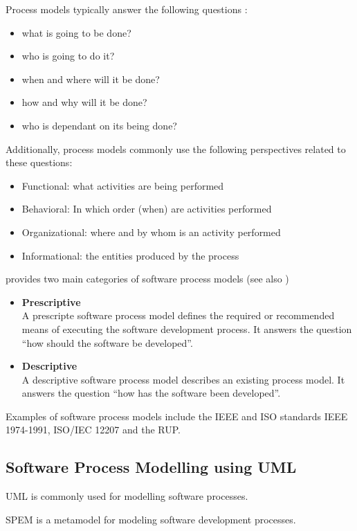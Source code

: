 Process models typically answer the following questions \citep{Curtis:1992kf}:
\begin{itemize}
	\item what is going to be done?
	\item who is going to do it?
	\item when and where will it be done?
	\item how and why will it be done?
	\item who is dependant on its being done?
\end{itemize}

Additionally, process models commonly use the following perspectives related to these questions:
\begin{itemize}
	\item Functional: what activities are being performed
	\item Behavioral: In which order (when) are activities performed
	\item Organizational: where and by whom is an activity performed
	\item Informational: the entities produced by the process
\end{itemize}

\cite{McChesney:1995aa} provides two main categories of software process models (see also \cite{Acuna:2001aa})
\begin{itemize}
	\item \textbf{Prescriptive}\\
	A prescripte software process model defines the required or recommended means of executing the software development process. It answers the question ``how should the software be developed''.
	\item \textbf{Descriptive}\\
	A descriptive software process model describes an existing process model. It answers the question ``how has the software been developed''.
\end{itemize}

Examples of software process models include the IEEE and ISO standards IEEE 1974-1991, ISO/IEC 12207 and the \acf{RUP}.

\subsection{Software Process Modelling using \ac{UML}}
\ac{UML} is commonly used for modelling software processes. 

\ac{SPEM} is a metamodel for modeling software development processes.

